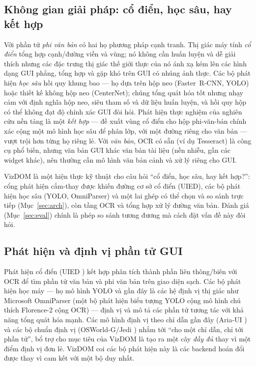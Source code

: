 \documentclass[11pt,a4paper]{article}
\begin{document}
\subsection{Không gian giải pháp: cổ điển, học sâu, hay kết hợp}
Với phần tử \emph{phi văn bản} có hai họ phương pháp cạnh tranh. Thị giác máy tính
\emph{cổ điển} tổng hợp cạnh/đường viền và vùng; nó không cần huấn luyện và dễ giải
thích nhưng các đặc trưng thị giác thế giới thực của nó ánh xạ kém lên các hình dạng
GUI phẳng, tổng hợp và gặp khó trên GUI có nhúng ảnh thực. Các bộ phát hiện \emph{học
sâu} hồi quy khung bao --- họ dựa trên hộp neo (Faster~R-CNN, YOLO) hoặc thiết kế
không hộp neo (CenterNet); chúng tổng quát hóa tốt nhưng nhạy cảm với định nghĩa hộp
neo, siêu tham số và dữ liệu huấn luyện, và hồi quy hộp có thể không đạt độ chính xác
GUI đòi hỏi. Phát hiện thực nghiệm của nghiên cứu nền tảng \cite{xie2020uied} là một
\emph{kết hợp} --- đề xuất vùng cổ điển cho hộp phi-văn-bản chính xác cộng một mô
hình học sâu để phân lớp, với một đường riêng cho văn bản --- vượt trội hơn từng họ
riêng lẻ. Với \emph{văn bản}, OCR có sẵn (ví dụ Tesseract) là công cụ phổ biến, nhưng
văn bản GUI khác văn bản tài liệu (nền nhiễu, gần các widget khác), nên thường cần mô
hình văn bản cảnh và xử lý riêng cho GUI.

VizDOM là một hiện thực kỹ thuật cho câu hỏi ``cổ điển, học sâu, hay kết hợp?'': cổng
phát hiện cắm-thay được khiến đường cơ sở cổ điển (UIED), các bộ phát hiện học sâu
(YOLO, OmniParser) và một lai ghép có thể chọn và so sánh trực tiếp
(Mục~\ref{sec:arch}), còn tầng OCR và tổng hợp xử lý đường văn bản. Đánh giá
(Mục~\ref{sec:eval}) chính là phép so sánh tương đương mà cách đặt vấn đề này đòi hỏi.

\subsection{Phát hiện và định vị phần tử GUI}
Phát hiện cổ điển (UIED \cite{xie2020uied}) kết hợp phân tích thành phần liên
thông/biên với OCR để tìm phần tử văn bản và phi văn bản trên giao diện sạch. Các
bộ phát hiện học máy --- họ mô hình YOLO \cite{ultralytics} và gần đây là các hệ
định vị thị giác như Microsoft OmniParser \cite{omniparser2024} (một bộ phát hiện
biểu tượng YOLO cộng mô hình chú thích Florence-2 \cite{florence2} cộng OCR) --- định
vị và mô tả các phần tử tương tác với khả năng tổng quát hóa mạnh. Các mô hình định
vị theo chỉ dẫn gần đây (Aria-UI \cite{ariaui2024}) và các bộ chuẩn định vị
(OSWorld-G/Jedi \cite{osworldg}) nhắm tới ``cho một chỉ dẫn, chỉ tới phần tử'', bổ
trợ cho mục tiêu của VizDOM là tạo ra một cây \emph{đầy đủ} thay vì một điểm định vị
đơn lẻ. VizDOM coi các bộ phát hiện này là các backend hoán đổi được thay vì cam kết
với một bộ duy nhất.
\end{document}
